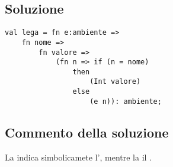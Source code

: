 \subsection{Soluzione}

\begin{lstlisting}
val lega = fn e:ambiente =>
	fn nome =>
		fn valore =>
			(fn n => if (n = nome)
			    then
					(Int valore)
			    else
					(e n)): ambiente;
\end{lstlisting}

\subsection{Commento della soluzione}

La  indica simbolicamete l', mentre la  il .
